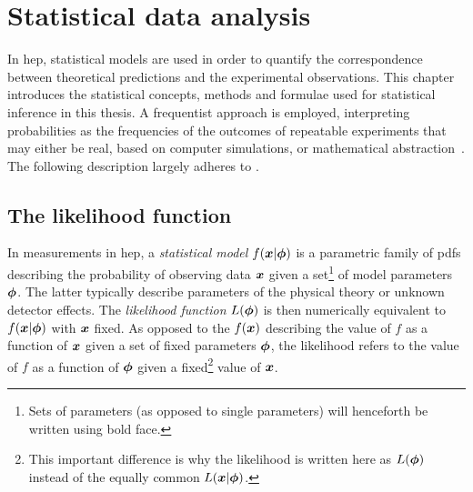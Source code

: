 

\chapter{Statistical data analysis}\label{ch:statistics}

\graphicspath{{chapter-statistics/Figs/Vector/}{chapter-statistics/Figs/}}

In \gls{hep}, statistical models are used in order to quantify the correspondence between theoretical predictions and the experimental observations.
This chapter introduces the statistical concepts, methods and formulae used for statistical inference in this thesis.
A frequentist approach is employed, interpreting probabilities as the frequencies of the outcomes of repeatable experiments that may either be real, based on computer simulations, or mathematical abstraction~\cite{pdg2020}.
The following description largely adheres to \cite{Cranmer:2015nia, Cowan:2010js}.

\section{The likelihood function}\label{sec:likelihood_function}
 
In measurements in \gls{hep}, a \textit{statistical model} $f(\makemebold{x}\vert\makemebold{\phi})$ is a parametric family of \glspl{pdf} describing the probability of observing data $\makemebold{x}$ given a set\footnote{Sets of parameters (as opposed to single parameters) will henceforth be written using bold face.} of model parameters $\makemebold{\phi}$.
The latter typically describe parameters of the physical theory or unknown detector effects. The \textit{likelihood function} $L(\makemebold{\phi})$ is then numerically equivalent to $f(\makemebold{x}\vert\makemebold{\phi})$ with $\makemebold{x}$ fixed.
As opposed to the  $f(\makemebold{x})$ describing the value of $f$ as a function of $\makemebold{x}$ given a set of fixed parameters $\makemebold{\phi}$, the likelihood refers to the value of $f$ as a function of $\makemebold{\phi}$ given a fixed\footnote{This important difference is why the likelihood is written here as $L(\makemebold{\phi})$ instead of the equally common $L(\makemebold{x}\vert\makemebold{\phi})$.} value of $\makemebold{x}$.

